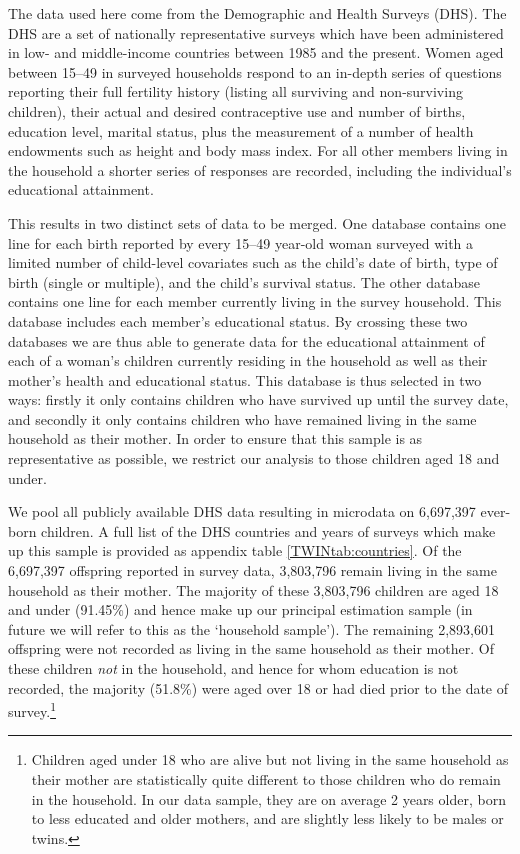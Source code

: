 The data used here come from the Demographic and Health Surveys (DHS).  The DHS 
are a set of nationally representative surveys which have been administered in 
low- and middle-income countries between 1985 and the present.  Women aged 
between 15--49 in surveyed households respond to an in-depth series of questions 
reporting their full fertility history (listing all surviving and non-surviving 
children), their actual and desired contraceptive use and number of births, 
education level, marital status, plus the measurement of a number of health 
endowments such as height and body mass index.  For all other members living in 
the household a shorter series of responses are recorded, including the 
individual's educational attainment.

This results in two distinct sets of data to be merged.  One database contains
one line for each birth reported by every 15--49 year-old woman surveyed with
a limited number of child-level covariates such as the child's date of birth,
type of birth (single or multiple), and the child's survival status.  The other
database contains one line for each member currently living in the survey 
household.  This database includes each member's educational status.  By 
crossing these two databases we are thus able to generate data for the
educational attainment of each of a woman's children currently residing in the 
household as well as their mother's health and educational status.  This 
database is thus selected in two ways: firstly it only contains children who
have survived up until the survey date, and secondly it only contains children
who have remained living in the same household as their mother.  In order to
ensure that this sample is as representative as possible, we restrict our
analysis to those children aged 18 and under.

We pool all publicly available DHS data resulting in microdata on 6,697,397 
ever-born children.  A full list of the DHS countries and years of surveys which
make up this sample is provided as appendix table \ref{TWINtab:countries}.  Of 
the 6,697,397 offspring reported in survey data, 3,803,796 remain living in the 
same household as their mother.  The majority of these 3,803,796 children are 
aged 18 and under (91.45\%) and hence make up our principal estimation sample (in 
future we will refer to this as the `household sample').  The remaining 2,893,601 
offspring were not recorded as living in the same household as their mother.  Of 
these children \emph{not} in the household, and hence for whom education is not 
recorded, the majority (51.8\%) were aged over 18 or had died prior to the date 
of survey.\footnote{Children aged under 18 who are alive but not living in the 
same household as their mother are statistically quite different to those 
children who do remain in the household.  In our data sample, they are on average 
2 years older, born to less educated and older mothers, and are slightly less 
likely to be males or twins.}

